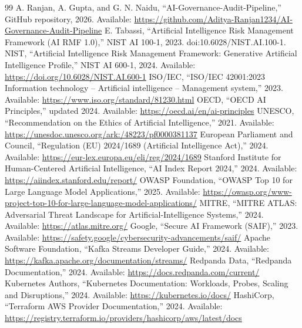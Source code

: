 \documentclass[12pt,oneside]{report}
\begin{document}
\renewcommand{\bibname}{Bibliography}
\sloppy
\begin{thebibliography}{99}
 A. Ranjan, A. Gupta, and G. N. Naidu, ``AI-Governance-Audit-Pipeline,'' GitHub repository, 2026. Available: \url{https://github.com/Aditya-Ranjan1234/AI-Governance-Audit-Pipeline}
 E. Tabassi, ``Artificial Intelligence Risk Management Framework (AI RMF 1.0),'' NIST AI 100-1, 2023. doi:10.6028/NIST.AI.100-1.
 NIST, ``Artificial Intelligence Risk Management Framework: Generative Artificial Intelligence Profile,'' NIST AI 600-1, 2024. Available: \url{https://doi.org/10.6028/NIST.AI.600-1}
 ISO/IEC, ``ISO/IEC 42001:2023 Information technology -- Artificial intelligence -- Management system,'' 2023. Available: \url{https://www.iso.org/standard/81230.html}
 OECD, ``OECD AI Principles,'' updated 2024. Available: \url{https://oecd.ai/en/ai-principles}
 UNESCO, ``Recommendation on the Ethics of Artificial Intelligence,'' 2021. Available: \url{https://unesdoc.unesco.org/ark:/48223/pf0000381137}
 European Parliament and Council, ``Regulation (EU) 2024/1689 (Artificial Intelligence Act),'' 2024. Available: \url{https://eur-lex.europa.eu/eli/reg/2024/1689}
 Stanford Institute for Human-Centered Artificial Intelligence, ``AI Index Report 2024,'' 2024. Available: \url{https://aiindex.stanford.edu/report/}
 OWASP Foundation, ``OWASP Top 10 for Large Language Model Applications,'' 2025. Available: \url{https://owasp.org/www-project-top-10-for-large-language-model-applications/}
 MITRE, ``MITRE ATLAS: Adversarial Threat Landscape for Artificial-Intelligence Systems,'' 2024. Available: \url{https://atlas.mitre.org/}
 Google, ``Secure AI Framework (SAIF),'' 2023. Available: \url{https://safety.google/cybersecurity-advancements/saif/}
 Apache Software Foundation, ``Kafka Streams Developer Guide,'' 2024. Available: \url{https://kafka.apache.org/documentation/streams/}
 Redpanda Data, ``Redpanda Documentation,'' 2024. Available: \url{https://docs.redpanda.com/current/}
 Kubernetes Authors, ``Kubernetes Documentation: Workloads, Probes, Scaling and Disruptions,'' 2024. Available: \url{https://kubernetes.io/docs/}
 HashiCorp, ``Terraform AWS Provider Documentation,'' 2024. Available: \url{https://registry.terraform.io/providers/hashicorp/aws/latest/docs}

\end{thebibliography}
\end{document}

